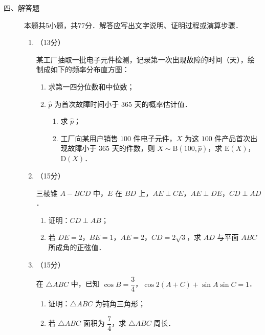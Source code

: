 \begin{description}
    \item[四、解答题] 本题共5小题，共77分．解答应写出文字说明、证明过程或演算步骤．
    \begin{enumerate}[leftmargin=5pt]
      \addtocounter{enumi}{+14}
        \item （13分）

        某工厂抽取一批电子元件检测，记录第一次出现故障的时间（天），绘制成如下的频率分布直方图：

        \begin{enumerate}[label=(\arabic*)]
            \item 求第一四分位数和中位数；
            \item $\hat{p}$ 为首次故障时间小于 $365$ 天的概率估计值．
            \begin{enumerate}[label=(\roman*)]
                \item 求 $\hat{p}$；
                \item 工厂向某用户销售 $100$ 件电子元件，$X$ 为这 $100$ 件产品首次出现故障小于 $365$ 天的件数，则 $X\sim \mathrm{B}(100,\hat{p})$，求 $\mathrm{E}(X)$，$\mathrm{D}(X)$．
            \end{enumerate}
        \end{enumerate}

        \item （15分）

        三棱锥 $A-BCD$ 中，$E$ 在 $BD$ 上，$AE\perp CE$，$AE\perp DE$，$CD\perp AD$．

        \begin{enumerate}[label=(\arabic*)]
            \item 证明：$CD\perp AB$；
            \item 若 $DE=2$，$BE=1$，$AE=2$，$CD=2\sqrt{3}$，求 $AD$ 与平面 $ABC$ 所成角的正弦值．
        \end{enumerate}

        \item （15分）

        在 $\triangle ABC$ 中，已知 $\cos B=\dfrac{3}{4}$，$\cos2(A+C)+\sin A\sin C=1$．

        \begin{enumerate}[label=(\arabic*)]
            \item 证明：$\triangle ABC$ 为钝角三角形；
            \item 若 $\triangle ABC$ 面积为 $\dfrac{7}{4}$，求 $\triangle ABC$ 周长．
        \end{enumerate}


\end{enumerate}
\end{description}
